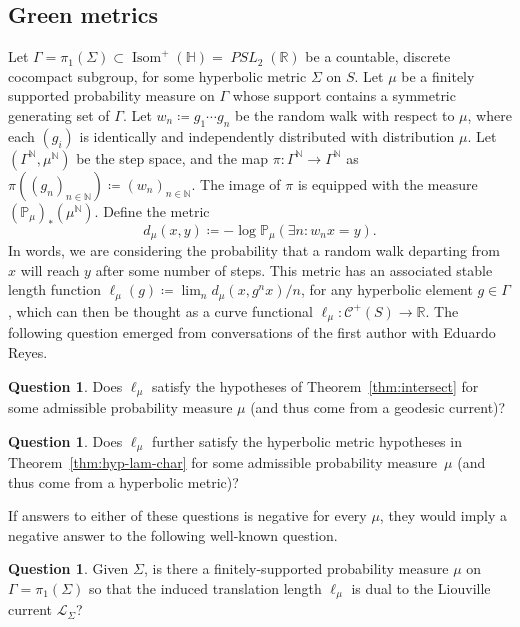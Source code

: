 \documentclass[11pt]{amsart}
\numberwithin{equation}{section}
\numberwithin{figure}{section}
\theoremstyle{definition}
\newtheorem{question}[theorem]{Question}
\theoremstyle{plain}
\DeclareMathOperator{\Isom}{Isom}
\DeclareMathOperator{\PSL}{\mathit{PSL}}
\newcommand{\Curves}{\mathcal{C}}
\begin{document}
\subsection{Green metrics}
\label{subsec:green}
Let $\Gamma=\pi_1(\Sigma) \subset \Isom^+(\mathbb{H})=\PSL_2(\mathbb{R})$ be a countable, discrete cocompact subgroup, for some hyperbolic metric $\Sigma$ on $S$.
Let $\mu$ be a finitely supported probability measure on $\Gamma$ whose support contains a symmetric generating set of $\Gamma$.
Let $w_n \coloneqq g_1 \cdots g_n$ be the random walk with respect to $\mu$, where each $(g_i)$ is identically and independently distributed with distribution $\mu$. Let $(\Gamma^{\mathbb{N}}, \mu^{\mathbb{N}})$ be the step space, and the map $\pi \colon \Gamma^{\mathbb{N}} \to \Gamma^{\mathbb{N}}$ as $\pi((g_n)_{n \in \mathbb{N}}) \coloneqq (w_n)_{n \in \mathbb{N}}$. The image of $\pi$ is equipped with the measure $(\mathbb{P}_{\mu})_*(\mu^{\mathbb{N}})$.
Define the metric \[ d_{\mu}(x,y) \coloneqq - \log \mathbb{P}_{\mu}(\exists n : w_n x =y).\]
In words, we are considering the probability that a random walk departing from $x$ will reach $y$ after some number of steps.
This metric has an associated stable length function $\ell_{\mu}(g) \coloneqq \lim_n d_{\mu}(x, g^n x)/n$, for any hyperbolic element $g \in \Gamma$, which can then be thought as a curve functional $\ell_{\mu} \colon \Curves^+(S) \to \mathbb{R}$. The following question emerged from conversations of the first author with Eduardo Reyes.

\begin{question}
Does $\ell_{\mu}$ satisfy the hypotheses of
Theorem~\ref{thm:intersect} for some admissible probability measure $\mu$ (and thus come from a geodesic current)?
\label{q:green-smoothing}
\end{question}

\begin{question}
Does $\ell_\mu$ further satisfy the
hyperbolic metric hypotheses in Theorem~\ref{thm:hyp-lam-char} for some admissible
probability measure~$\mu$ (and thus come
from a hyperbolic metric)?
\label{q:Green}
\end{question}

If answers to either of these questions is negative for every $\mu$,
they would imply a negative answer to the following well-known question.

\begin{question}
Given $\Sigma$, is there a finitely-supported probability measure
$\mu$ on $\Gamma=\pi_1(\Sigma)$ so that the induced translation length
$\ell_{\mu}$ is dual to the Liouville current $\mathcal{L}_{\Sigma}$?
\label{q:singularity}
\end{question}
\end{document}
